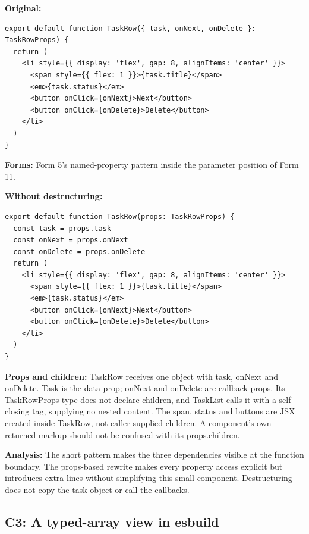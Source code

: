 \documentclass[10pt,a4paper]{article}
\begin{document}

\textbf{Original:}

\begin{lstlisting}[language=GuideJS]
export default function TaskRow({ task, onNext, onDelete }: TaskRowProps) {
  return (
    <li style={{ display: 'flex', gap: 8, alignItems: 'center' }}>
      <span style={{ flex: 1 }}>{task.title}</span>
      <em>{task.status}</em>
      <button onClick={onNext}>Next</button>
      <button onClick={onDelete}>Delete</button>
    </li>
  )
}
\end{lstlisting}

\textbf{Forms:} Form 5's named-property pattern inside the parameter position of Form 11.


\textbf{Without destructuring:}

\begin{lstlisting}[language=GuideJS]
export default function TaskRow(props: TaskRowProps) {
  const task = props.task
  const onNext = props.onNext
  const onDelete = props.onDelete
  return (
    <li style={{ display: 'flex', gap: 8, alignItems: 'center' }}>
      <span style={{ flex: 1 }}>{task.title}</span>
      <em>{task.status}</em>
      <button onClick={onNext}>Next</button>
      <button onClick={onDelete}>Delete</button>
    </li>
  )
}
\end{lstlisting}

\textbf{Props and children:} TaskRow receives one object with task, onNext and onDelete. Task is the data prop; onNext and onDelete are callback props. Its TaskRowProps type does not declare children, and TaskList calls it with a self-closing tag, supplying no nested content. The span, status and buttons are JSX created inside TaskRow, not caller-supplied children. A component's own returned markup should not be confused with its props.children.

\textbf{Analysis:} The short pattern makes the three dependencies visible at the function boundary. The props-based rewrite makes every property access explicit but introduces extra lines without simplifying this small component. Destructuring does not copy the task object or call the callbacks.

\subsection{C3: A typed-array view in esbuild}
\end{document}
